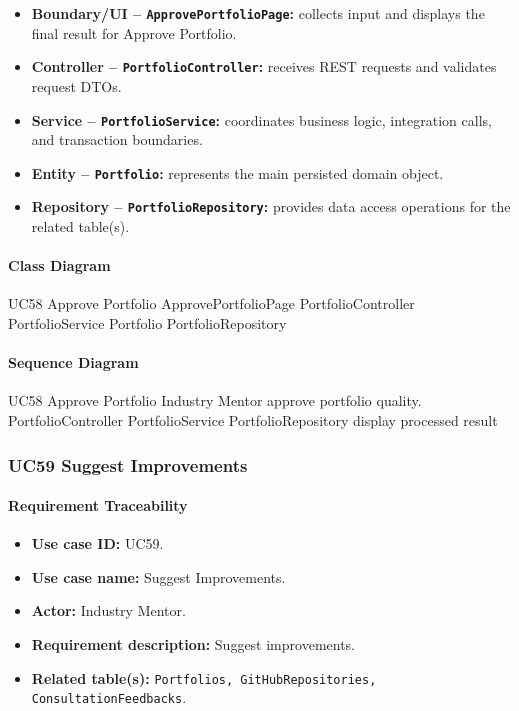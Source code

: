 \begin{itemize}
    \item \textbf{Boundary/UI -- \texttt{ApprovePortfolioPage}:} collects input and displays the final result for Approve Portfolio.
    \item \textbf{Controller -- \texttt{PortfolioController}:} receives REST requests and validates request DTOs.
    \item \textbf{Service -- \texttt{PortfolioService}:} coordinates business logic, integration calls, and transaction boundaries.
    \item \textbf{Entity -- \texttt{Portfolio}:} represents the main persisted domain object.
    \item \textbf{Repository -- \texttt{PortfolioRepository}:} provides data access operations for the related table(s).
\end{itemize}

\paragraph{Class Diagram}

\ClassDiagram
{UC58 Approve Portfolio}
{ApprovePortfolioPage}
{PortfolioController}
{PortfolioService}
{Portfolio}
{PortfolioRepository}

\paragraph{Sequence Diagram}

\SequenceDiagram
{UC58 Approve Portfolio}
{Industry Mentor}
{approve portfolio quality.}
{PortfolioController}
{PortfolioService}
{PortfolioRepository}
{display processed result}

\subsubsection{UC59 Suggest Improvements}

\paragraph{Requirement Traceability}

\begin{itemize}
    \item \textbf{Use case ID:} UC59.
    \item \textbf{Use case name:} Suggest Improvements.
    \item \textbf{Actor:} Industry Mentor.
    \item \textbf{Requirement description:} Suggest improvements.
    \item \textbf{Related table(s):} \texttt{Portfolios, GitHubRepositories, ConsultationFeedbacks}.
\end{itemize}


